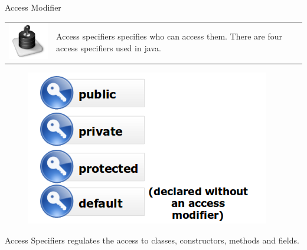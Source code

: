 \documentclass[14pt]{beamer}
\begin{document}
\begin{frame}{Access Modifier}
 \begin{tabular}{l l}
\begin{minipage}{0.1\textwidth}
\includegraphics[scale=.4]{Access-Specifiers.png}
\end{minipage}
&
\begin{minipage}{0.85\textwidth}
Access specifiers specifies who can access them. There are four access specifiers used in java.
\end{minipage}
\end{tabular}
\begin{figure}[H]
 \begin{center}
   \includegraphics[scale=.3]{list-access-specifier.png}   
 \end{center}
  \end{figure}
Access Specifiers regulates the access to classes, constructors, methods and fields.
  \end{frame}
\end{document}
